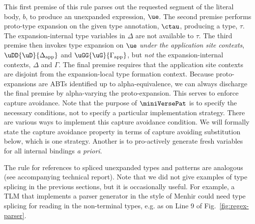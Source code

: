 \documentclass[acmsmall]{acmart}
\begin{document}

\noindent
This first premise of this rule parses out the requested segment of the literal body, $b$, to produce an unexpanded expression, $\ue$. The second premise performs proto-type expansion on the given type annotation, $\ctau$, producing a type, $\tau$. The expansion-internal type variables in $\Delta$ are not available to $\tau$. The third premise then invokes type expansion on $\ue$ \emph{under the application site contexts}, $\uDD{\uD}{\Delta_\text{app}}$ and $\uGG{\uG}{\Gamma_\text{app}}$, but \emph{not} the expansion-internal contexts, $\Delta$ and $\Gamma$.  The final premise requires that the application site contexts are disjoint from the expansion-local type formation context. Because proto-expansions are ABTs identified up to alpha-equivalence, we can always discharge the final premise by alpha-varying the proto-expansion. This serves to enforce capture avoidance. Note that the purpose of $\miniVersePat$ is to specify the necessary conditions, not to specify a particular implementation strategy. There are various ways to implement this capture avoidance condition. We will formally state the capture avoidance property in terms of capture avoiding substitution below, which is one strategy. Another is to pro-actively generate fresh variables for all internal bindings \emph{a priori}.

The rule for references to spliced unexpanded types and patterns are analogous (see accompanying technical report). Note that we did not give examples of type splicing in the previous sections, but it is occasionally useful. For example, a TLM that implements a parser generator in the style of Menhir could need type splicing for reading in the non-terminal types, e.g. as on Line 9 of Fig.~\ref{fig:regex-parser}.
\end{document}
